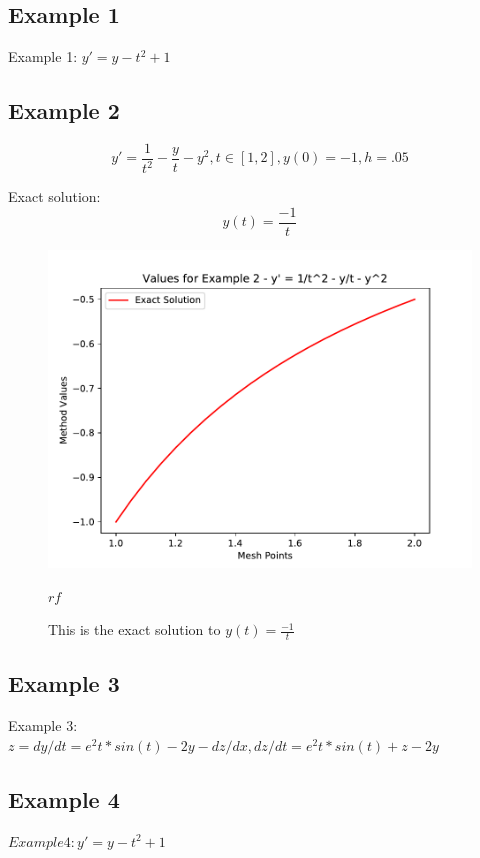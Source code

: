 \documentclass[11pt]{article}
\begin{document}
\subsection{Example 1}
Example 1: $y' = y - t^2 + 1$

\subsection{Example 2}
\begin{equation}\label{ex:2:ivp}
y{'} = \frac{1}{t^2} - \frac{y}{t} - y^2, t \in [1,2], y(0) = -1, h = .05
\end{equation}

Exact solution:
\begin{equation}\label{ex:2:ivp}
y(t) = \frac{-1}{t}
\end{equation}
\begin{figure}
\centering
\includegraphics[width=.5\textwidth]{exact_solution_example_2.pdf}
\caption{This is the exact solution to $y(t)=\frac{-1}{t}$}
\label{fig:ex:2:solution}
$rf$
\end{figure}


\subsection{Example 3}
Example 3: 
$z = dy/dt = e^2t * sin(t) - 2y - dz/dx , dz/dt = e^2t * sin(t) + z - 2y$


\subsection{Example 4}
$Example 4: y' = y - t^2 + 1$
\end{document}
